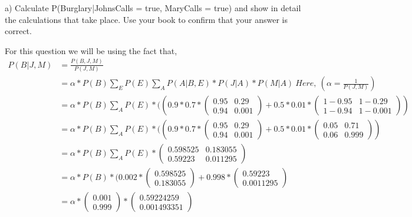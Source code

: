 \documentclass[12pt]{article}
\newenvironment{problem}[2][Problem]{\begin{trivlist}
\item[\hskip \labelsep {\bfseries #1}\hskip \labelsep {\bfseries #2.}]}{\end{trivlist}}
\begin{document}
\begin{problem}{2} 

    a) Calculate P(Burglary|JohnsCalls = true, MaryCalls =
    true) and show in detail the calculations that take place. Use your book to confirm that your answer is correct.
    
    For this question we will be using the fact that,
    \begin{align*}
        P(B|J,M) 
        & = \frac{P(B,J,M)}{P(J,M)} \\ 
        & = \alpha * P(B) \sum_{E} P(E) \sum_{A} P(A|B,E)*P(J|A)*P(M|A) \ Here, \ (\alpha = \frac{1}{P(J,M)})\\
        & = \alpha * P(B) \sum_{A} P(E) * ((0.9 * 0.7 * \left( \begin{array}{cc} 0.95 & 0.29 \\
0.94 & 0.001 \end{array} \right) + 0.5 * 0.01 * \left( \begin{array}{cc} 1-0.95 & 1-0.29 \\
1-0.94 & 1-0.001 \end{array} \right))\\
        & = \alpha * P(B) \sum_{A} P(E) * ((0.9 * 0.7 * \left( \begin{array}{cc} 0.95 & 0.29 \\
0.94 & 0.001 \end{array} \right) + 0.5 * 0.01 * \left( \begin{array}{cc} 0.05 & 0.71 \\
0.06 & 0.999 \end{array} \right))\\
        & = \alpha * P(B) \sum_{A} P(E) * \left( \begin{array}{cc} 0.598525 & 0.183055 \\
0.59223 & 0.011295 \end{array} \right)\\
        & = \alpha * P(B) * (0.002 * \left( \begin{array}{c} 0.598525 \\ 0.183055 \end{array} \right) + 0.998 * \left( \begin{array}{c} 0.59223 \\ 0.0011295 \end{array} \right)\\
        & = \alpha * \left( \begin{array}{c} 0.001 \\ 0.999 \end{array} \right) * \left( \begin{array}{c} 0.59224259 \\ 0.001493351 \end{array} \right)\\

\end{align*}
\end{problem}
\end{document}
